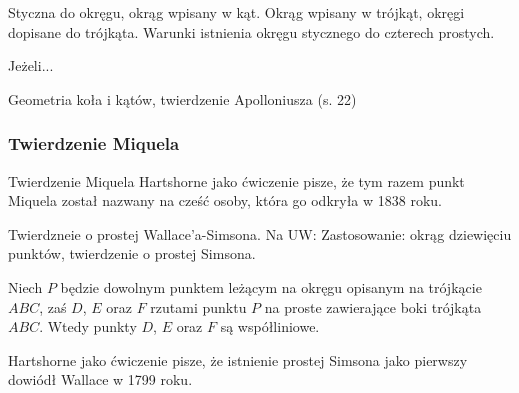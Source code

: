 Styczna do okręgu, okrąg wpisany w kąt.
Okrąg wpisany w trójkąt, okręgi dopisane do trójkąta.
Warunki istnienia okręgu stycznego do czterech prostych.

\begin{proposition}
	Jeżeli...
\end{proposition}

Geometria koła i kątów, twierdzenie Apolloniusza (s. 22)

\subsubsection{Twierdzenie Miquela}
Twierdzenie Miquela
\loremipsum
Hartshorne jako ćwiczenie \cite[s. 61]{hartshorne2000} pisze, że tym razem punkt Miquela został nazwany na cześć osoby, która go odkryła w 1838 roku.

Twierdzneie o prostej Wallace'a-Simsona.
Na UW: Zastosowanie: okrąg dziewięciu punktów, twierdzenie o prostej Simsona.

\begin{proposition}
	Niech $P$ będzie dowolnym punktem leżącym na okręgu opisanym na trójkącie $ABC$, zaś $D$, $E$ oraz $F$ rzutami punktu $P$ na proste zawierające boki trójkąta $ABC$.
	Wtedy punkty $D$, $E$ oraz $F$ są współliniowe.
\end{proposition}

Hartshorne jako ćwiczenie \cite[s. 61]{hartshorne2000} pisze, że istnienie prostej Simsona jako pierwszy dowiódł Wallace w 1799 roku.
